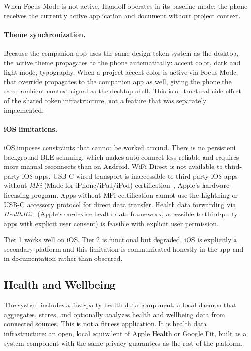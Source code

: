 When Focus Mode is not active, Handoff operates in its baseline mode: the
phone receives the currently active application and document without project
context.

\paragraph{Theme synchronization.}
Because the companion app uses the same design token system as the desktop,
the active theme propagates to the phone automatically: accent color, dark and
light mode, typography. When a project accent color is active via Focus Mode,
that override propagates to the companion app as well, giving the phone the
same ambient context signal as the desktop shell. This is a structural side
effect of the shared token infrastructure, not a feature that was separately
implemented.

\paragraph{iOS limitations.}
iOS imposes constraints that cannot be worked around. There is no persistent
background BLE scanning, which makes auto-connect less reliable and requires
more manual reconnects than on Android. WiFi Direct is not available to
third-party iOS apps. USB-C wired transport is inaccessible to third-party iOS apps without
\emph{MFi} (Made for iPhone/iPad/iPod) certification~\cite{apple:mfi}, Apple's
hardware licensing program. Apps without MFi certification cannot use the
Lightning or USB-C accessory protocol for direct data transfer. Health data forwarding via \emph{HealthKit}~\cite{apple:healthkit}
(Apple's on-device health data framework, accessible to third-party apps with
explicit user consent) is feasible with explicit user permission.

Tier 1 works well on iOS. Tier 2 is functional but degraded. iOS is explicitly
a secondary platform and this limitation is communicated honestly in the app
and in documentation rather than obscured.

\subsection{Health and Wellbeing}
\label{sec:health}

The system includes a first-party health data component: a local daemon that
aggregates, stores, and optionally analyzes health and wellbeing data from
connected sources. This is not a fitness application. It is health data
infrastructure: an open, local equivalent of Apple Health or Google Fit, built
as a system component with the same privacy guarantees as the rest of the
platform.

